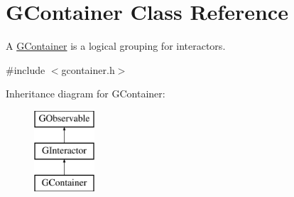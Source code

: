 \hypertarget{classsgl_1_1GContainer}{}\section{G\+Container Class Reference}
\label{classsgl_1_1GContainer}


A \mbox{\hyperlink{classsgl_1_1GContainer}{G\+Container}} is a logical grouping for interactors.  




{\ttfamily \#include $<$gcontainer.\+h$>$}

Inheritance diagram for G\+Container\+:\begin{figure}[H]
\begin{center}
\leavevmode
\includegraphics[height=3.000000cm]{classsgl_1_1GContainer}
\end{center}
\end{figure}
